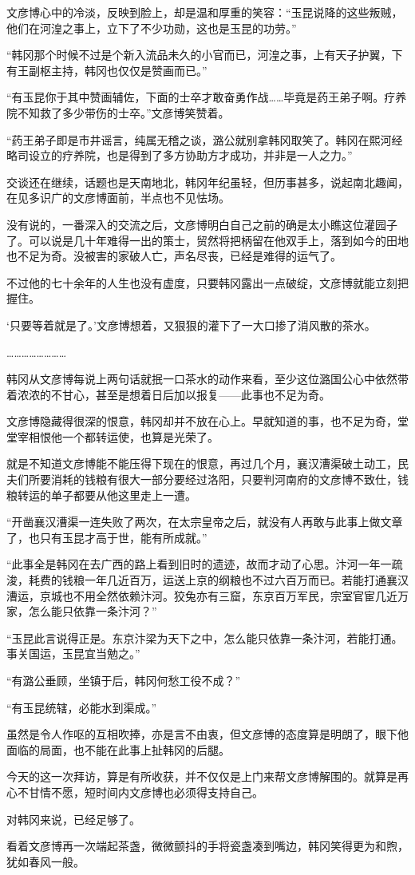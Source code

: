 文彦博心中的冷淡，反映到脸上，却是温和厚重的笑容：“玉昆说降的这些叛贼，他们在河湟之事上，立下了不少功勋，这也是玉昆的功劳。”

“韩冈那个时候不过是个新入流品未久的小官而已，河湟之事，上有天子护翼，下有王副枢主持，韩冈也仅仅是赞画而已。”

“有玉昆你于其中赞画辅佐，下面的士卒才敢奋勇作战……毕竟是药王弟子啊。疗养院不知救了多少带伤的士卒。”文彦博笑赞着。

“药王弟子即是市井谣言，纯属无稽之谈，潞公就别拿韩冈取笑了。韩冈在熙河经略司设立的疗养院，也是得到了多方协助方才成功，并非是一人之力。”

交谈还在继续，话题也是天南地北，韩冈年纪虽轻，但历事甚多，说起南北趣闻，在见多识广的文彦博面前，半点也不见怯场。

没有说的，一番深入的交流之后，文彦博明白自己之前的确是太小瞧这位灌园子了。可以说是几十年难得一出的策士，贸然将把柄留在他双手上，落到如今的田地也不足为奇。没被害的家破人亡，声名尽丧，已经是难得的运气了。

不过他的七十余年的人生也没有虚度，只要韩冈露出一点破绽，文彦博就能立刻把握住。

‘只要等着就是了。’文彦博想着，又狠狠的灌下了一大口掺了消风散的茶水。

……………………

韩冈从文彦博每说上两句话就抿一口茶水的动作来看，至少这位潞国公心中依然带着浓浓的不甘心，甚至是想着日后加以报复——此事也不足为奇。

文彦博隐藏得很深的恨意，韩冈却并不放在心上。早就知道的事，也不足为奇，堂堂宰相恨他一个都转运使，也算是光荣了。

就是不知道文彦博能不能压得下现在的恨意，再过几个月，襄汉漕渠破土动工，民夫们所要消耗的钱粮有很大一部分要经过洛阳，只要判河南府的文彦博不致仕，钱粮转运的单子都要从他这里走上一遭。

“开凿襄汉漕渠一连失败了两次，在太宗皇帝之后，就没有人再敢与此事上做文章了，也只有玉昆才高于世，能有所成就。”

“此事全是韩冈在去广西的路上看到旧时的遗迹，故而才动了心思。汴河一年一疏浚，耗费的钱粮一年几近百万，运送上京的纲粮也不过六百万而已。若能打通襄汉漕运，京城也不用全然依赖汴河。狡兔亦有三窟，东京百万军民，宗室官宦几近万家，怎么能只依靠一条汴河？”

“玉昆此言说得正是。东京汴梁为天下之中，怎么能只依靠一条汴河，若能打通。事关国运，玉昆宜当勉之。”

“有潞公垂顾，坐镇于后，韩冈何愁工役不成？”

“有玉昆统辖，必能水到渠成。”

虽然是令人作呕的互相吹捧，亦是言不由衷，但文彦博的态度算是明朗了，眼下他面临的局面，也不能在此事上扯韩冈的后腿。

今天的这一次拜访，算是有所收获，并不仅仅是上门来帮文彦博解围的。就算是再心不甘情不愿，短时间内文彦博也必须得支持自己。

对韩冈来说，已经足够了。

看着文彦博再一次端起茶盏，微微颤抖的手将瓷盏凑到嘴边，韩冈笑得更为和煦，犹如春风一般。

